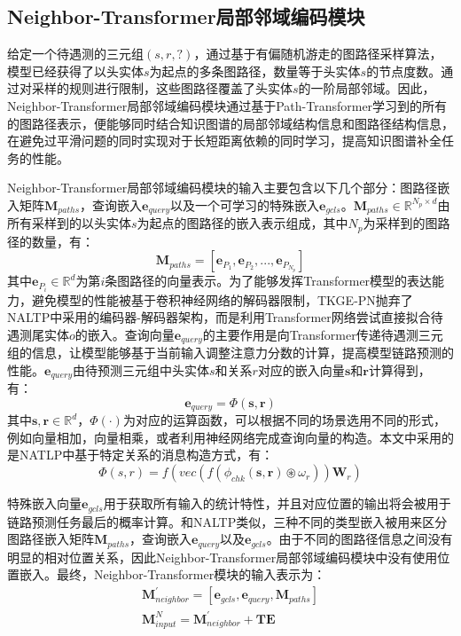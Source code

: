\subsection{Neighbor-Transformer局部邻域编码模块}

给定一个待遇测的三元组$(s,r,?)$，通过基于有偏随机游走的图路径采样算法，模型已经获得了以头实体$s$为起点的多条图路径，数量等于头实体$s$的节点度数。通过对采样的规则进行限制，这些图路径覆盖了头实体$s$的一阶局部邻域。因此，Neighbor-Transformer局部邻域编码模块通过基于Path-Transformer学习到的所有的图路径表示，便能够同时结合知识图谱的局部邻域结构信息和图路径结构信息，在避免过平滑问题的同时实现对于长短距离依赖的同时学习，提高知识图谱补全任务的性能。

Neighbor-Transformer局部邻域编码模块的输入主要包含以下几个部分：图路径嵌入矩阵$\mathbf{M}_{paths}$，查询嵌入$\boldsymbol{e}_{query}$以及一个可学习的特殊嵌入$\boldsymbol{e}_{gcls}$。$\mathbf{M}_{paths}\in\mathbb{R}^{N_p\times d}$由所有采样到的以头实体$s$为起点的图路径的嵌入表示组成，其中$N_p$为采样到的图路径的数量，有：
\begin{equation}
  \mathbf{M}_{paths}=\left[ \boldsymbol{e}_{P_1},\boldsymbol{e}_{P_2},...,\boldsymbol{e}_{P_{N_p}}\right]
\end{equation}
其中$\boldsymbol{e}_{P_i} \in \mathbb{R}^d$为第$i$条图路径的向量表示。为了能够发挥Transformer模型的表达能力，避免模型的性能被基于卷积神经网络的解码器限制，TKGE-PN抛弃了NALTP中采用的编码器-解码器架构，而是利用Transformer网络尝试直接拟合待遇测尾实体$o$的嵌入。查询向量$\boldsymbol{e}_{query}$的主要作用是向Transformer传递待遇测三元组的信息，让模型能够基于当前输入调整注意力分数的计算，提高模型链路预测的性能。$\boldsymbol{e}_{query}$由待预测三元组中头实体$s$和关系$r$对应的嵌入向量$\boldsymbol{s}$和$\boldsymbol{r}$计算得到，有：
\begin{equation}
  \boldsymbol{e}_{query}=\varPhi(\boldsymbol{s},\boldsymbol{r})
\end{equation}
其中$\boldsymbol{s},\boldsymbol{r}\in\mathbb{R}^d$，$\varPhi(\cdot)$为对应的运算函数，可以根据不同的场景选用不同的形式，例如向量相加，向量相乘，或者利用神经网络完成查询向量的构造。本文中采用的是NATLP中基于特定关系的消息构造方式，有：
\begin{equation}
  \varPhi \left(s,r\right) = f\left(vec\left(f\left(\phi_{chk}\left(\boldsymbol{s},\boldsymbol{r}\right) \circledast \omega_{r} \right)\right)\mathbf{W}_{r}\right)
\end{equation}

特殊嵌入向量$\mathbf{e}_{gcls}$用于获取所有输入的统计特性，并且对应位置的输出将会被用于链路预测任务最后的概率计算。和NALTP类似，三种不同的类型嵌入被用来区分图路径嵌入矩阵$\mathbf{M}_{paths}$，查询嵌入$\boldsymbol{e}_{query}$以及$\boldsymbol{e}_{gcls}$。由于不同的图路径信息之间没有明显的相对位置关系，因此Neighbor-Transformer局部邻域编码模块中没有使用位置嵌入。最终，Neighbor-Transformer模块的输入表示为：
\begin{gather}
  \mathbf{M}_{neighbor}^{\prime}=[\boldsymbol{e}_{gcls},\boldsymbol{e}_{query},\mathbf{M}_{paths}]\\
  \mathbf{M}_{input}^{N}=\mathbf{M}_{neighbor}^{\prime}+\mathbf{TE}
\end{gather}

